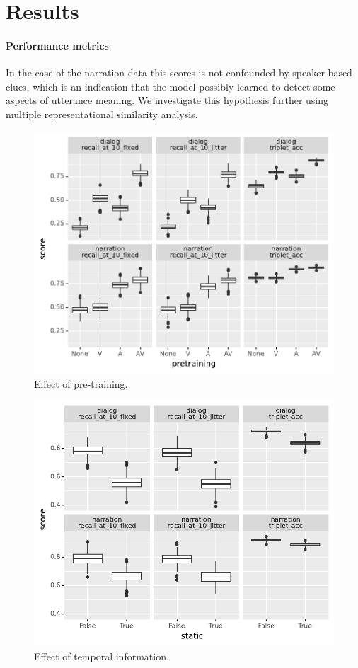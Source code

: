 \section{Results}
\label{sec:results}
\paragraph{Performance metrics}


In the case of the narration data this scores is not confounded by
speaker-based clues, which is an indication that the model possibly
learned to detect some aspects of utterance meaning. We investigate
this hypothesis further using multiple representational similarity
analysis.
 
\begin{figure}
  \centering
  \includegraphics[width=\textwidth]{results/ablations/pretraining.pdf}
  \caption{Effect of pre-training.}
  \label{fig:pretraining}
\end{figure}

\begin{figure}
  \centering
  \includegraphics[width=\textwidth]{results/ablations/static.pdf}
  \caption{Effect of temporal information.}
  \label{fig:static}
\end{figure}


